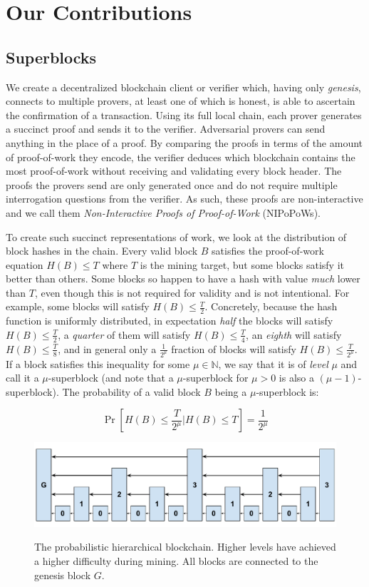 \section{Our Contributions}
\subsection{Superblocks}

We create a decentralized blockchain client or verifier which, having only
\emph{genesis}, connects to multiple provers, at least one of which is honest,
is able to ascertain the confirmation of a transaction. Using its full local
chain, each prover generates a succinct proof and sends it to the verifier.
Adversarial provers can send anything in the place of a proof. By comparing the
proofs in terms of the amount of proof-of-work they encode, the verifier deduces
which blockchain contains the most proof-of-work without receiving and
validating every block header. The proofs the provers send are only generated
once and do not require multiple interrogation questions from the verifier. As
such, these proofs are non-interactive and we call them \emph{Non-Interactive
Proofs of Proof-of-Work} (NIPoPoWs).

To create such succinct representations of work, we look at the distribution of
block hashes in the chain. Every valid block $B$ satisfies the proof-of-work
equation $H(B) \leq T$ where $T$ is the mining target, but some blocks satisfy
it better than others. Some blocks so happen to have a hash with value
\emph{much} lower than $T$, even though this is not required for validity and is
not intentional. For example, some blocks will satisfy $H(B) \leq \frac{T}{2}$.
Concretely, because the hash function is uniformly distributed, in expectation
\emph{half} the blocks will satisfy $H(B) \leq \frac{T}{2}$, a \emph{quarter} of
them will satisfy $H(B) \leq \frac{T}{4}$, an \emph{eighth} will satisfy $H(B)
\leq \frac{T}{8}$, and in general only a $\frac{1}{2^\mu}$ fraction of blocks
will satisfy $H(B) \leq \frac{T}{2^\mu}$. If a block satisfies this inequality
for some $\mu \in \mathbb{N}$, we say that it is of \emph{level} $\mu$ and call
it a $\mu$-superblock (and note that a $\mu$-superblock for $\mu > 0$ is also
a $(\mu - 1)$-superblock). The probability of a valid block $B$ being a
$\mu$-superblock is:

\[
\Pr[H(B) \leq \frac{T}{2^\mu}|H(B) \leq T] = \frac{1}{2^\mu}
\]

\begin{figure}
    \caption{The probabilistic hierarchical blockchain.
    Higher levels have achieved a higher difficulty during
    mining. All blocks are connected to the genesis block $G$.}
    \centering
    \includegraphics[width=0.7\columnwidth,keepaspectratio]{chapters/introduction/figures/hierarchical-ledger-span.pdf}
    \label{fig.hierarchy}
\end{figure}


